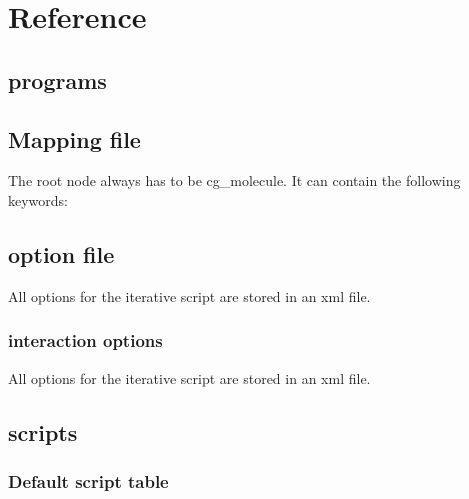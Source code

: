 \chapter{Reference}
\section{programs}

\section{Mapping file}
\label{sec:ref_mapping}
The root node always has to be cg\_molecule. It can contain the following keywords:



\section{option file}
All options for the iterative script are stored in an xml file.
\label{sec:ref_options}


\subsection{interaction options}
All options for the iterative script are stored in an xml file.
\label{sec:ref_interaction}


\section{scripts}
\subsection{Default script table}


